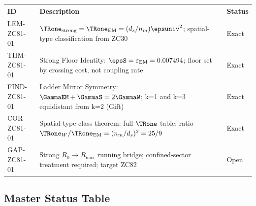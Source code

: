 \documentclass[12pt, a4paper]{article}
\renewcommand{\epsEM}{\varepsilon_{\rm EM}}
\begin{document}
\begin{formalbox}[title={Atomic Registry --- ZC81}]
\begin{center}
\renewcommand{\arraystretch}{1.3}
\small
\begin{tabular}{lp{7.6cm}l}
\toprule
\textbf{ID} & \textbf{Description} & \textbf{Status} \\
\midrule
LEM-ZC81-01
  & $\TRone_{\rm strong} = \TRone_{\rm EM} = (d_s/n_m)\epsuniv^2$;
    spatial-type classification from ZC30
  & Exact \\[3pt]
THM-ZC81-01
  & Strong Floor Identity: $\epsS = \epsEM = 0.007494$;
    floor set by crossing cost, not coupling rate
  & Exact \\[3pt]
FIND-ZC81-01
  & Ladder Mirror Symmetry: $\GammaEM + \GammaS = 2\GammaW$;
    k=1 and k=3 equidistant from k=2 (Gift)
  & Exact \\[3pt]
COR-ZC81-01
  & Spatial-type class theorem: full $\TRone$ table;
    ratio $\TRone_W/\TRone_{\rm EM} = (n_m/d_s)^2 = 25/9$
  & Exact \\[3pt]
GAP-ZC81-01
  & Strong $R_0{\to}R_{\max}$ running bridge;
    confined-sector treatment required; target ZC82
  & Open \\[3pt]
\bottomrule
\end{tabular}
\end{center}
\end{formalbox}

\subsection{Master Status Table}
\label{sec:status}
\end{document}
